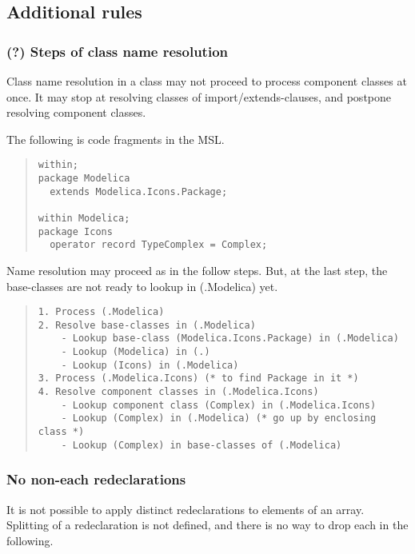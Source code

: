 \documentclass[10pt,b5paper]{article}
\begin{document}

\subsection{Additional rules}

\subsubsection*{(?) Steps of class name resolution}

Class name resolution in a class may not proceed to process component
classes at once.  It may stop at resolving classes of
import/extends-clauses, and postpone resolving component classes.

The following is code fragments in the MSL.

\begin{quote}
\begin{lstlisting}[aboveskip=-\baselineskip]
within;
package Modelica
  extends Modelica.Icons.Package;

within Modelica;
package Icons
  operator record TypeComplex = Complex;
\end{lstlisting}
\end{quote}

Name resolution may proceed as in the follow steps.  But, at the last
step, the base-classes are not ready to lookup in (.Modelica) yet.
\begin{quote}
\begin{verbatim}
1. Process (.Modelica)
2. Resolve base-classes in (.Modelica)
    - Lookup base-class (Modelica.Icons.Package) in (.Modelica)
    - Lookup (Modelica) in (.)
    - Lookup (Icons) in (.Modelica)
3. Process (.Modelica.Icons) (* to find Package in it *)
4. Resolve component classes in (.Modelica.Icons)
    - Lookup component class (Complex) in (.Modelica.Icons)
    - Lookup (Complex) in (.Modelica) (* go up by enclosing class *)
    - Lookup (Complex) in base-classes of (.Modelica)
\end{verbatim}
\end{quote}

\subsubsection*{No non-each redeclarations}

It is not possible to apply distinct redeclarations to elements of an
array.  Splitting of a redeclaration is not defined, and there is no
way to drop each in the following.
\end{document}
